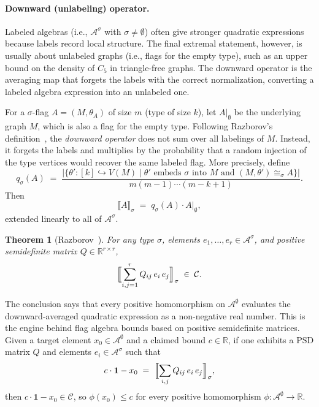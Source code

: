 \documentclass{article}
\newtheorem{theorem}{Theorem}[section]
\begin{document}
\paragraph{Downward (unlabeling) operator.}
Labeled algebras (i.e., $\mathcal{A}^\sigma$ with
$\sigma \neq \emptyset$) often give stronger quadratic expressions because
labels record local structure.  The final extremal statement, however, is
usually about unlabeled graphs (i.e., flags for the empty type), such as an
upper bound on the density of $C_5$ in triangle-free graphs.  The downward
operator is the averaging map that forgets the labels with the correct
normalization, converting a labeled algebra expression into an unlabeled one.

For a $\sigma$-flag $A=(M,\theta_A)$ of size $m$ (type of size $k$), let
$A|_\emptyset$ be the underlying graph $M$, which is also a flag for the empty
type.  Following Razborov's definition~\cite{razborov2007flag}, the
\emph{downward operator} does not sum over all labelings of $M$.  Instead, it
forgets the labels and multiplies by the probability that a random injection
of the type vertices would recover the same labeled flag.  More precisely,
define
\[
  q_\sigma(A)
  \;=\;
  \frac{
    \bigl|\{\theta' : [k]\hookrightarrow V(M)
       \mid \theta' \text{ embeds }\sigma\text{ into }M
       \text{ and } (M,\theta')\cong_\sigma A\}\bigr|}
       {m(m-1)\cdots(m-k+1)}.
\]
Then
\[
  \llbracket A \rrbracket_\sigma
  \;=\;
  q_\sigma(A)\cdot A|_\emptyset,
\]
extended linearly to all of $\mathcal{A}^\sigma$.

\begin{theorem}[Razborov~{\cite{razborov2007flag}}]
  \label{thm:sdp-nonneg}
  For any type $\sigma$, elements $e_1,\ldots,e_r \in \mathcal{A}^\sigma$,
  and positive semidefinite matrix $Q \in \mathbb{R}^{r\times r}$,
  \[
    \Bigl\llbracket \sum_{i,j=1}^r Q_{ij}\, e_i\, e_j \Bigr\rrbracket_\sigma
    \;\in\; \mathcal{C}.
  \]
\end{theorem}

The conclusion says that every positive homomorphism on
$\mathcal{A}^\emptyset$ evaluates the downward-averaged quadratic expression
as a non-negative real number.  This is the engine behind flag algebra bounds
based on positive semidefinite matrices.  Given a target element
$x_0 \in \mathcal{A}^\emptyset$ and a claimed bound $c \in \mathbb{R}$, if
one exhibits a PSD matrix $Q$ and elements $e_i \in \mathcal{A}^\sigma$ such
that
\[
  c \cdot \mathbf{1} - x_0
  \;=\;
  \Bigl\llbracket \sum_{i,j} Q_{ij}\, e_i\, e_j \Bigr\rrbracket_\sigma,
\]
then $c\cdot\mathbf{1}-x_0\in\mathcal{C}$, so
$\phi(x_0) \leq c$ for every positive homomorphism
$\phi:\mathcal{A}^\emptyset\to\mathbb{R}$.
\end{document}
